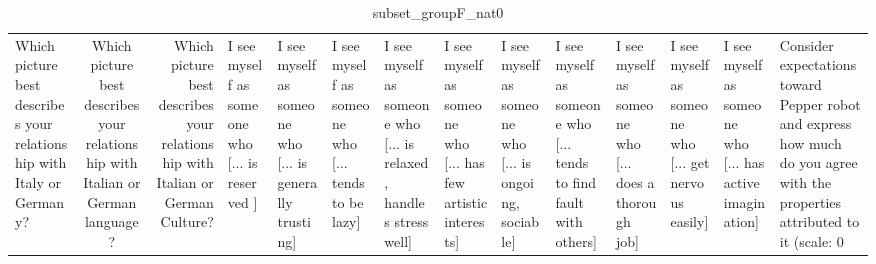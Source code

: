 \begin{table}
\caption{subset_groupF_nat0}
\label{tab:subset_groupF_nat0}
\begin{tabular}{lcr}
\toprule
Which picture best describes your relationship with Italy or Germany? & Which picture best describes your relationship with Italian or German language? & Which picture best describes your relationship with Italian or German Culture? & I see myself as someone who  [... is reserved ] & I see myself as someone who  [... is generally trusting] & I see myself as someone who  [... tends to be lazy] & I see myself as someone who  [... is relaxed, handles stress well] & I see myself as someone who  [... has few artistic interests] & I see myself as someone who  [... is ongoing, sociable] & I see myself as someone who  [... tends to find fault with others] & I see myself as someone who  [... does a thorough job] & I see myself as someone who  [... get nervous easily] & I see myself as someone who  [... has active imagination] & Consider expectations toward Pepper robot and express how much do you agree with the properties attributed to it (scale: 0%
\end{tabular}
\end{table}
